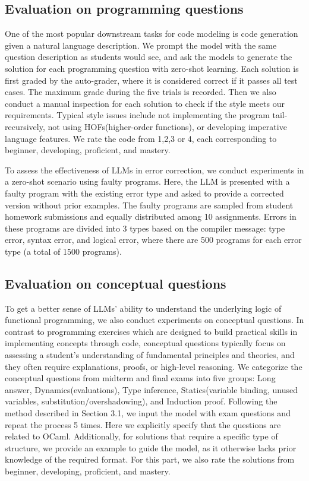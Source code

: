 \subsection{Evaluation on programming questions}


One of the most popular downstream tasks for code modeling is code generation given a
natural language description. We prompt the model with the same question description as students would see, and ask the models to generate the solution for each programming question with zero-shot learning. Each solution is first graded by the auto-grader, where it is considered correct if it passes all test cases. The maximum grade during the five trials is recorded. Then we also conduct a manual inspection for each solution to check if the style meets our requirements. Typical style issues include not implementing the program tail-recursively, not using HOFs(higher-order functions), or developing imperative language features. We rate the code from 1,2,3 or 4, each corresponding to beginner, developing, proficient, and mastery.

To assess the effectiveness of LLMs in error correction, we conduct experiments in a zero-shot scenario using faulty programs. Here, the LLM is presented with a faulty program with the existing error type and asked to provide a corrected version without prior examples. The faulty programs are sampled from student homework submissions and equally distributed among 10 assignments. Errors in these programs are divided into 3 types based on the compiler message: type error, syntax error, and logical error, where there are 500 programs for each error type (a total of 1500 programs). 

\subsection{Evaluation on conceptual questions}

To get a better sense of LLMs' ability to understand the underlying logic of functional programming, we also conduct experiments on conceptual questions. In contrast to programming exercises which are designed to build practical skills in implementing concepts through code, conceptual questions typically focus on assessing a student's understanding of fundamental principles and theories, and they often require explanations, proofs, or high-level reasoning. We categorize the conceptual questions from midterm and final exams into five groups: Long answer, Dynamics(evaluations), Type inference, Statics(variable binding, unused variables, substitution/overshadowing), and Induction proof. Following the method described in Section 3.1, we input the model with exam questions and repeat the process 5 times. Here we explicitly specify that the questions are related to OCaml. Additionally, for solutions that require a specific type of structure, we provide an example to guide the model, as it otherwise lacks prior knowledge of the required format. For this part, we also rate the solutions from beginner, developing, proficient, and mastery.

